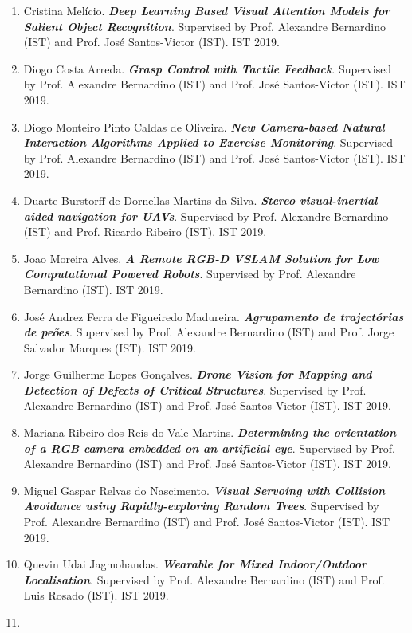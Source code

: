 \begin{enumerate}
  Netherlands). IST 2019.
\item
  Cristina Melício. \emph{\textbf{Deep Learning Based Visual Attention
  Models for Salient Object Recognition}}. Supervised by Prof. Alexandre
  Bernardino (IST) and Prof. José Santos-Victor (IST). IST 2019.
\item
  Diogo Costa Arreda. \emph{\textbf{Grasp Control with Tactile
  Feedback}}. Supervised by Prof. Alexandre Bernardino (IST) and Prof.
  José Santos-Victor (IST). IST 2019.
\item
  Diogo Monteiro Pinto Caldas de Oliveira. \emph{\textbf{New
  Camera-based Natural Interaction Algorithms Applied to Exercise
  Monitoring}}. Supervised by Prof. Alexandre Bernardino (IST) and Prof.
  José Santos-Victor (IST). IST 2019.
\item
  Duarte Burstorff de Dornellas Martins da Silva. \emph{\textbf{Stereo
  visual-inertial aided navigation for UAVs}}. Supervised by Prof.
  Alexandre Bernardino (IST) and Prof. Ricardo Ribeiro (IST). IST 2019.
\item
  Joao Moreira Alves. \emph{\textbf{A Remote RGB-D VSLAM Solution for
  Low Computational Powered Robots}}. Supervised by Prof. Alexandre
  Bernardino (IST). IST 2019.
\item
  José Andrez Ferra de Figueiredo Madureira. \emph{\textbf{Agrupamento
  de trajectórias de peões}}. Supervised by Prof. Alexandre Bernardino
  (IST) and Prof. Jorge Salvador Marques (IST). IST 2019.
\item
  Jorge Guilherme Lopes Gonçalves. \emph{\textbf{Drone Vision for
  Mapping and Detection of Defects of Critical Structures}}. Supervised
  by Prof. Alexandre Bernardino (IST) and Prof. José Santos-Victor
  (IST). IST 2019.
\item
  Mariana Ribeiro dos Reis do Vale Martins. \emph{\textbf{Determining
  the orientation of a RGB camera embedded on an artificial eye}}.
  Supervised by Prof. Alexandre Bernardino (IST) and Prof. José
  Santos-Victor (IST). IST 2019.
\item
  Miguel Gaspar Relvas do Nascimento. \emph{\textbf{Visual Servoing with
  Collision Avoidance using Rapidly-exploring Random Trees}}. Supervised
  by Prof. Alexandre Bernardino (IST) and Prof. José Santos-Victor
  (IST). IST 2019.
\item
  Quevin Udai Jagmohandas. \emph{\textbf{Wearable for Mixed
  Indoor/Outdoor Localisation}}. Supervised by Prof. Alexandre
  Bernardino (IST) and Prof. Luis Rosado (IST). IST 2019.
\item

\end{enumerate}
